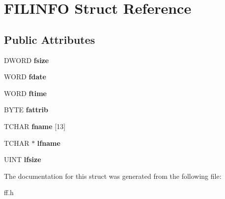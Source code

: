 \hypertarget{struct_f_i_l_i_n_f_o}{}\section{F\+I\+L\+I\+N\+FO Struct Reference}
\label{struct_f_i_l_i_n_f_o}
\subsection*{Public Attributes}
\begin{DoxyCompactItemize}
\item 
\mbox{\label{struct_f_i_l_i_n_f_o_aee7441af7dc0c443d1e1e6011cc7dcac}} 
D\+W\+O\+RD {\bfseries fsize}
\item 
\mbox{\label{struct_f_i_l_i_n_f_o_a7c01c48a15b1b49da459924437b0bd52}} 
W\+O\+RD {\bfseries fdate}
\item 
\mbox{\label{struct_f_i_l_i_n_f_o_ae0f751b79621bf7b29669f177bbe6b9a}} 
W\+O\+RD {\bfseries ftime}
\item 
\mbox{\label{struct_f_i_l_i_n_f_o_a838d542585831b085537b363f18205c0}} 
B\+Y\+TE {\bfseries fattrib}
\item 
\mbox{\label{struct_f_i_l_i_n_f_o_abd852510f2f79b4ec773156d8942dc7c}} 
T\+C\+H\+AR {\bfseries fname} \mbox{[}13\mbox{]}
\item 
\mbox{\label{struct_f_i_l_i_n_f_o_ac4506c29e0219130dff46b01a1b5c023}} 
T\+C\+H\+AR $\ast$ {\bfseries lfname}
\item 
\mbox{\label{struct_f_i_l_i_n_f_o_a2527c511ff4d12d285dbf3c4b3c9fb7b}} 
U\+I\+NT {\bfseries lfsize}
\end{DoxyCompactItemize}


The documentation for this struct was generated from the following file\+:\begin{DoxyCompactItemize}
\item 
ff.\+h\end{DoxyCompactItemize}
